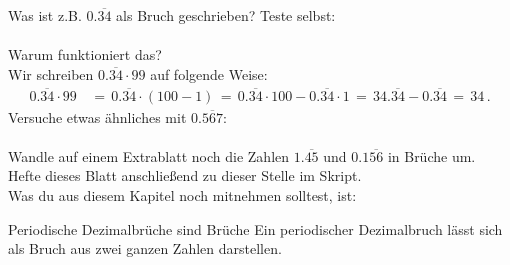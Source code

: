 Was ist z.B. $0.\overline{34}$ als Bruch geschrieben?
Teste selbst:\\
\\
Warum funktioniert das?\\
Wir schreiben $0.\overline{34} \cdot 99$ auf folgende Weise:
\begin{align*}
	0.\overline{34} \cdot 99 &\,=\, 0.\overline{34} \cdot (100 - 1)
	\,=\, 0.\overline{34} \cdot 100 - 0.\overline{34} \cdot 1
	\,=\, 34.\overline{34} - 0.\overline{34}
	\,=\, 34\,.
\end{align*}
Versuche etwas ähnliches mit $0.\overline{567}$:\\
\\

Wandle auf einem Extrablatt noch die Zahlen $1.\overline{45}$ und $0.1\overline{56}$ in Brüche um.
Hefte dieses Blatt anschließend zu dieser Stelle im Skript.\\
Was du aus diesem Kapitel noch mitnehmen solltest, ist:

\begin{law}{Periodische Dezimalbrüche sind Brüche}
	\label{law:periodicIsRational}
	Ein periodischer Dezimalbruch lässt sich als Bruch aus zwei ganzen Zahlen darstellen.
\end{law}~

